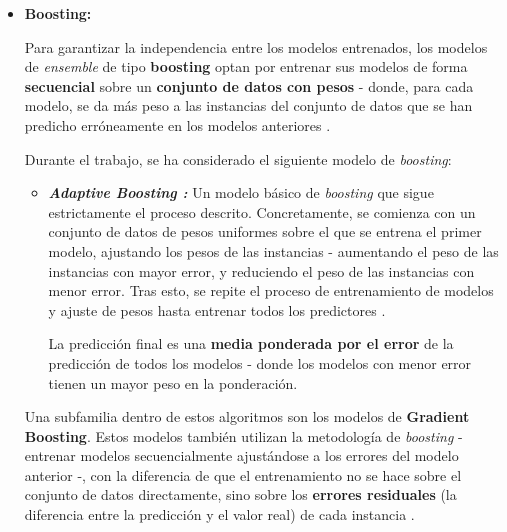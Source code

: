 \begin{itemize}[leftmargin=*]
	\item \textbf{Boosting:}
	
	Para garantizar la independencia entre los modelos entrenados, los modelos de \textit{ensemble} de tipo \textbf{boosting} optan por entrenar sus modelos de forma \textbf{secuencial} sobre un \textbf{conjunto de datos con pesos} - donde, para cada modelo, se da más peso a las instancias del conjunto de datos que se han predicho erróneamente en los modelos anteriores \cite{aima}.
	
	Durante el trabajo, se ha considerado el siguiente modelo de \textit{boosting}:
	
	\begin{itemize}
		\item \textbf{\textit{Adaptive Boosting \cite{adaboost}:}} Un modelo básico de \textit{boosting} que sigue estrictamente el proceso descrito. Concretamente, se comienza con un conjunto de datos de pesos uniformes sobre el que se entrena el primer modelo, ajustando los pesos de las instancias - aumentando el peso de las instancias con mayor error, y reduciendo el peso de las instancias con menor error. Tras esto, se repite el proceso de entrenamiento de modelos y ajuste de pesos hasta entrenar todos los predictores \cite{aima}.
		
		La predicción final es una \textbf{media ponderada por el error} de la predicción de todos los modelos - donde los modelos con menor error tienen un mayor peso en la ponderación.
	\end{itemize}
	
	Una subfamilia dentro de estos algoritmos son los modelos de \textbf{Gradient Boosting}. Estos modelos también utilizan la metodología de \textit{boosting} - entrenar modelos secuencialmente ajustándose a los errores del modelo anterior -, con la diferencia de que el entrenamiento no se hace sobre el conjunto de datos directamente, sino sobre los \textbf{errores residuales} (la diferencia entre la predicción y el valor real) de cada instancia \cite{gradientboosting}. 
	

\end{itemize}

